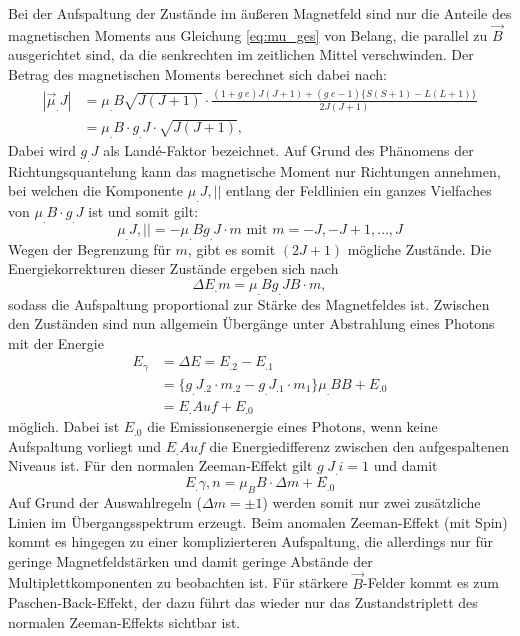 Bei der Aufspaltung der Zustände im äußeren Magnetfeld sind nur die Anteile des magnetischen Moments aus Gleichung \eqref{eq:mu_ges} von Belang, die parallel zu $\vec{B}$ ausgerichtet sind, da die senkrechten im zeitlichen Mittel verschwinden.
Der Betrag des magnetischen Moments berechnet sich dabei nach:
\[
\begin{split}
|\vec{\mu}_.J|&=\mu_.B \sqrt{J(J+1)} \cdot \frac{(1+g_.e) J (J+1) + (g_.e-1)\{S(S+1)-L(L+1)\}}{2 J (J+1)}\\
&= \mu_.B\cdot g_.J \cdot\sqrt{J(J+1)},
\end{split}
\]
Dabei wird $g_.J$ als Landé-Faktor bezeichnet. Auf Grund des Phänomens der Richtungsquantelung kann das magnetische Moment nur Richtungen annehmen, bei welchen die Komponente $\mu_.{J,||}$ entlang der Feldlinien ein ganzes Vielfaches von $\mu_.B \cdot g_.J$ ist und somit gilt:
\[
\mu_.{J, ||}=-\mu_.B g_.J \cdot m \text{ mit } m=-J,-J+1,\hdots, J
\]
Wegen der Begrenzung für $m$, gibt es somit $(2J+1)$ mögliche Zustände.
Die Energiekorrekturen dieser Zustände ergeben sich nach
\[
\Delta E_.m = \mu_.B g_.J B \cdot m,
\]
sodass die Aufspaltung proportional zur Stärke des Magnetfeldes ist.
Zwischen den Zuständen sind nun allgemein Übergänge unter Abstrahlung eines Photons mit der Energie
\begin{equation} 
	\begin{split}
	E_\gamma &= \Delta E = E_.2-E_.1 \\
	&=\{g_.{J_.2} \cdot m_.2-g_.{J_.1} \cdot m_1 \} \mu_.B B  + E_.0 \label{eq:gij}\\
	&=E_.{Auf}+E_.0
	\end{split}
\end{equation}
möglich.
Dabei ist $E_.0$ die Emissionsenergie eines Photons, wenn keine Aufspaltung vorliegt und $E_.{Auf}$ die Energiedifferenz zwischen den aufgespaltenen Niveaus ist.
Für den normalen Zeeman-Effekt gilt $g_.{J_.i}=1$ und damit
\begin{equation}
E_.{\gamma,n} = \mu_B B \cdot \Delta m + E_.0
\end{equation}
Auf Grund der Auswahlregeln ($\Delta m = \pm 1$) werden somit nur zwei zusätzliche Linien im Übergangsspektrum erzeugt.
Beim anomalen Zeeman-Effekt (mit Spin) kommt es hingegen zu einer komplizierteren Aufspaltung, die allerdings nur für geringe Magnetfeldstärken und damit geringe Abstände der Multiplettkomponenten zu beobachten ist.
Für stärkere $\vec{B}$-Felder kommt es zum Paschen-Back-Effekt, der dazu führt das wieder nur das Zustandstriplett des normalen Zeeman-Effekts sichtbar ist.


